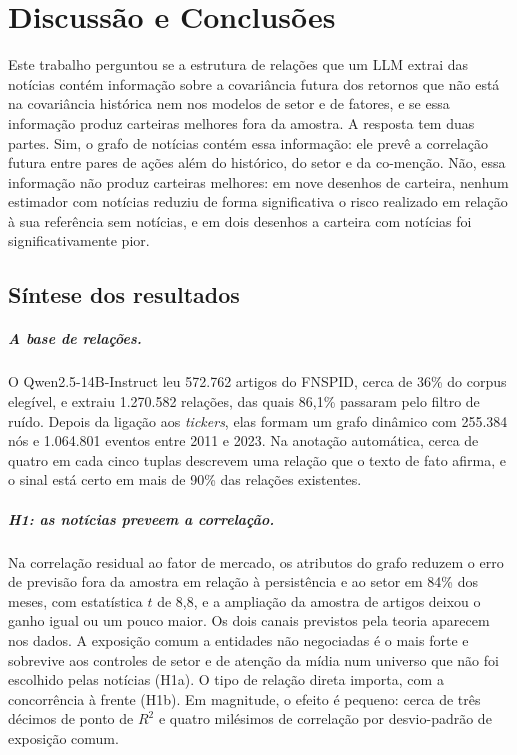 \chapter{Discussão e Conclusões}
\label{cap:conclusao}

Este trabalho perguntou se a estrutura de relações que um LLM extrai das notícias contém informação sobre
a covariância futura dos retornos que não está na covariância histórica nem nos modelos de setor e de
fatores, e se essa informação produz carteiras melhores fora da amostra. A resposta tem duas partes. Sim,
o grafo de notícias contém essa informação: ele prevê a correlação futura entre pares de ações além do
histórico, do setor e da co-menção. Não, essa informação não produz carteiras melhores: em nove desenhos de
carteira, nenhum estimador com notícias reduziu de forma significativa o risco realizado em relação à sua
referência sem notícias, e em dois desenhos a carteira com notícias foi significativamente pior.

\section{Síntese dos resultados}
\label{sec:sintese}

\paragraph{A base de relações.} O Qwen2.5-14B-Instruct leu 572.762 artigos do FNSPID, cerca de 36\% do
corpus elegível, e extraiu 1.270.582 relações, das quais 86,1\% passaram pelo filtro de ruído. Depois da
ligação aos \emph{tickers}, elas formam um grafo dinâmico com 255.384 nós e 1.064.801 eventos entre 2011 e
2023. Na anotação automática, cerca de quatro em cada cinco tuplas descrevem uma relação que o texto de
fato afirma, e o sinal está certo em mais de 90\% das relações existentes.

\paragraph{H1: as notícias preveem a correlação.} Na correlação residual ao fator de mercado, os atributos
do grafo reduzem o erro de previsão fora da amostra em relação à persistência e ao setor em 84\% dos meses,
com estatística $t$ de 8,8, e a ampliação da amostra de artigos deixou o ganho igual ou um pouco maior. Os
dois canais previstos pela teoria aparecem nos dados. A exposição comum a entidades não negociadas é o
mais forte e sobrevive aos controles de setor e de atenção da mídia num universo que não foi escolhido
pelas notícias (H1a). O tipo de relação direta importa, com a concorrência à frente (H1b). Em magnitude, o
efeito é pequeno: cerca de três décimos de ponto de $R^2$ e quatro milésimos de correlação por
desvio-padrão de exposição comum.

